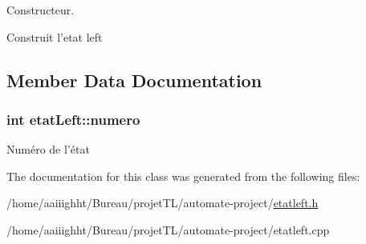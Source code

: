 Constructeur. 

Construit l'etat left 

\subsection{Member Data Documentation}
\hypertarget{classetat_left_acf1c86368edc9def78782bf5db7aa651}{
\subsubsection[{numero}]{\setlength{\rightskip}{0pt plus 5cm}int etat\-Left\-::numero\hspace{0.3cm}{\ttfamily [protected]}}}\label{classetat_left_acf1c86368edc9def78782bf5db7aa651}
Numéro de l'état 

The documentation for this class was generated from the following files\-:\begin{DoxyCompactItemize}
\item 
/home/aaiiighht/\-Bureau/projet\-T\-L/automate-\/project/\hyperlink{etatleft_8h}{etatleft.\-h}\item 
/home/aaiiighht/\-Bureau/projet\-T\-L/automate-\/project/etatleft.\-cpp\end{DoxyCompactItemize}
